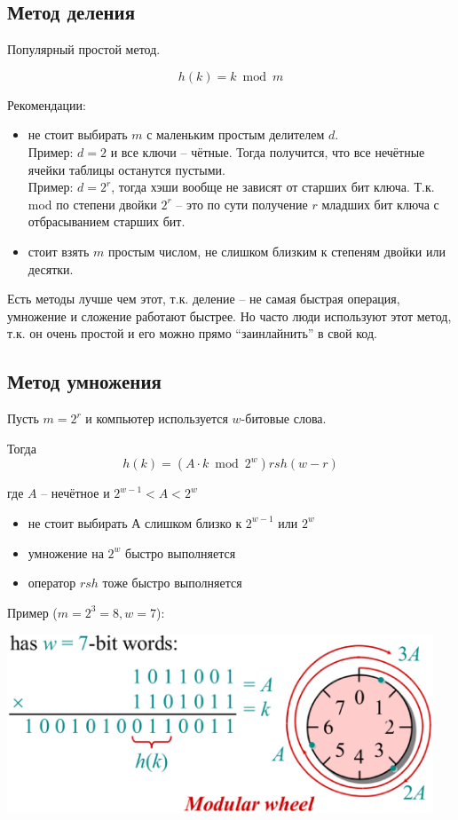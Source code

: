 \documentclass[a4paper,11pt]{article}
\begin{document}
\subsection{Метод деления}

Популярный простой метод.

$$
h(k) = k \bmod m
$$

Рекомендации:
\begin{itemize}
\item не стоит выбирать $m$ с маленьким простым делителем $d$. \\

  Пример: $d = 2$ и все ключи -- чётные. Тогда получится, что все нечётные
  ячейки таблицы останутся пустыми. \\

  Пример: $d = 2^r$, тогда хэши вообще не зависят от старших бит ключа. Т.к.
  mod по степени двойки $2^r$ -- это по сути получение $r$ младших бит ключа с
  отбрасыванием старших бит.

\item стоит взять $m$ простым числом, не слишком близким к степеням двойки или
  десятки.
\end{itemize}

Есть методы лучше чем этот, т.к. деление -- не самая быстрая операция, умножение
и сложение работают быстрее. Но часто люди используют этот метод, т.к. он очень
простой и его можно прямо ``заинлайнить'' в свой код.

\subsection{Метод умножения}

Пусть $m = 2^r$ и компьютер используется $w$-битовые слова.

Тогда
$$
h(k) = (A \cdot k \bmod 2^w) rsh (w - r)
$$

где $A$ -- нечётное и $2^{w-1} < A < 2^w$

\begin{itemize}
\item не стоит выбирать $А$ слишком близко к $2^{w-1}$ или $2^w$
\item умножение на $2^w$ быстро выполняется
\item оператор $rsh$ тоже быстро выполняется
\end{itemize}

Пример ($m = 2^3 = 8, w = 7$):

\begin{center}
\includegraphics[width=5in]{lecture7/wheel.eps}
\end{center}
\end{document}
